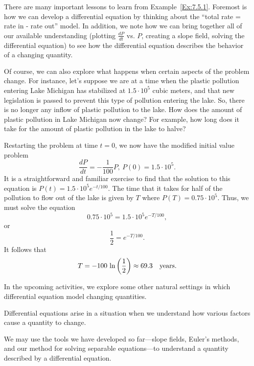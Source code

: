 \afterex

There are many important lessons to learn from Example~\ref{Ex:7.5.1}.  Foremost is how we can develop a differential equation by thinking about the ``total rate = rate in - rate out'' model.  In addition, we note how we can bring together all of our available understanding (plotting $\frac{dP}{dt}$ vs. $P$, creating a slope field, solving the differential equation) to see how the differential equation describes the behavior of a changing quantity.

Of course, we can also explore what happens when certain aspects of the problem change.  For instance, let's suppose we are at a time when the plastic pollution entering Lake Michigan has
stabilized at $1.5\cdot10^5$ cubic meters, and that new legislation is
passed to prevent this type of pollution entering the lake.  So, there is no longer any inflow of plastic pollution to the lake.  How does the amount of plastic pollution in Lake Michigan now change?  For example, how long does it take for the amount of plastic pollution in the lake to halve?

Restarting the problem at time $t=0$, we now have the modified initial value problem
$$
\frac{dP}{dt} = -\frac{1}{100}P, \ P(0) = 1.5\cdot10^5.
$$
It is a straightforward and familiar exercise to find that the solution to this equation is $P(t) = 1.5\cdot10^5
e^{-t/100}$.  The time that it takes for half of the pollution to flow
out of the lake is given by $T$ where $P(T) = 0.75\cdot10^5$.  Thus, we must solve the equation
$$0.75\cdot10^5 = 1.5\cdot10^5e^{-T/100},$$
or
$$ \frac12 = e^{-T/100}.$$
It follows that 
$$T = -100\thinspace\ln\left(\frac12\right) \approx 69.3 \quad\hbox{years.}$$

In the upcoming activities, we explore some other natural settings in which differential equation model changing quantities.

\newpage





\begin{summary}
\item Differential equations arise in a situation when we understand
  how various factors cause a quantity to change.
\item We may use the tools we have developed so far---slope
  fields, Euler's methods, and our method for solving separable
  equations---to understand a quantity described by a differential
  equation. 
\end{summary}

\nin \hrulefill

 




\clearpage
